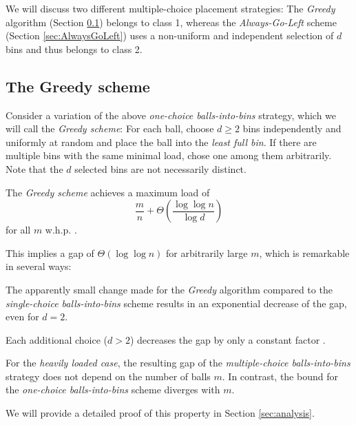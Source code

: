 \documentclass[a4paper,12pt]{article}
\newcommand\todo[1]{\textcolor{red}{(#1)}}
\begin{document}
We will discuss two different multiple-choice placement strategies: The \emph{Greedy} algorithm (Section \ref{sec:greedy}) belongs to class 1, whereas the \emph{Always-Go-Left} scheme (Section \ref{sec:AlwaysGoLeft}) uses a non-uniform and independent selection of $d$ bins and thus belongs to class 2.

\subsection{The Greedy scheme}
\label{sec:greedy}

Consider a variation of the above \emph{one-choice balls-into-bins} strategy, which we will call the \emph{Greedy scheme}: For each ball, choose $d \geq 2$ bins independently and uniformly at random and place the ball into the \emph{least full bin}. If there are multiple bins with the same minimal load, chose one among them arbitrarily. Note that the $d$ selected bins are not necessarily distinct. 

The \emph{Greedy scheme} achieves a maximum load of 
\[
\frac{m}{n} + \Theta\left(\frac{\log \log n}{\log d} \right)
\]
for all $m$ w.h.p. \cite{ABKU99} \cite{BCSV06}.

This implies a gap of $\Theta\left(\log \log n \right)$ for arbitrarily large $m$, which is remarkable in several ways:
\begin{compactitem}
\item The apparently small change made for the \emph{Greedy} algorithm compared to the \emph{single-choice balls-into-bins} scheme results in an exponential decrease of the gap, even for $d=2$. 
\item Each additional choice ($d > 2$) decreases the gap by only a constant factor \cite{MRS01}. 
\item For the \emph{heavily loaded case}, the resulting gap of the \emph{multiple-choice balls-into-bins} strategy does not depend on the number of balls $m$. In contrast, the bound for the \emph{one-choice balls-into-bins} scheme diverges with $m$.
\begin{comment}
\todo{the following is only true for class 1 algorithms}
\item The given bounds are \emph{tight}, meaning that no other strategy that places each ball into one of $d$ randomly selected bins achieves a gap that is asymptotically lower.
\end{comment}
\end{compactitem}

We will provide a detailed proof of this property in Section \ref{sec:analysis}.
\end{document}
